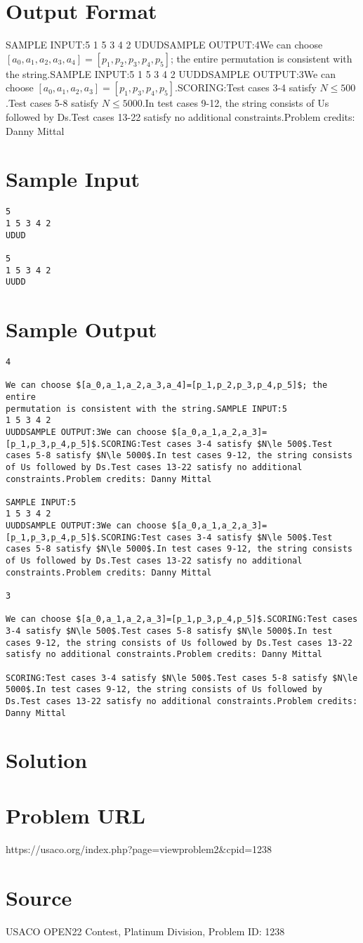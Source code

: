 \documentclass[12pt]{article}
\begin{document}
\section*{Output Format}
SAMPLE INPUT:5
1 5 3 4 2
UDUDSAMPLE OUTPUT:4We can choose $[a_0,a_1,a_2,a_3,a_4]=[p_1,p_2,p_3,p_4,p_5]$; the entire
permutation is consistent with the string.SAMPLE INPUT:5
1 5 3 4 2
UUDDSAMPLE OUTPUT:3We can choose $[a_0,a_1,a_2,a_3]=[p_1,p_3,p_4,p_5]$.SCORING:Test cases 3-4 satisfy $N\le 500$.Test cases 5-8 satisfy $N\le 5000$.In test cases 9-12, the string consists of Us followed by Ds.Test cases 13-22 satisfy no additional constraints.Problem credits: Danny Mittal

\section*{Sample Input}
\begin{verbatim}
5
1 5 3 4 2
UDUD

5
1 5 3 4 2
UUDD
\end{verbatim}

\section*{Sample Output}
\begin{verbatim}
4

We can choose $[a_0,a_1,a_2,a_3,a_4]=[p_1,p_2,p_3,p_4,p_5]$; the entire
permutation is consistent with the string.SAMPLE INPUT:5
1 5 3 4 2
UUDDSAMPLE OUTPUT:3We can choose $[a_0,a_1,a_2,a_3]=[p_1,p_3,p_4,p_5]$.SCORING:Test cases 3-4 satisfy $N\le 500$.Test cases 5-8 satisfy $N\le 5000$.In test cases 9-12, the string consists of Us followed by Ds.Test cases 13-22 satisfy no additional constraints.Problem credits: Danny Mittal

SAMPLE INPUT:5
1 5 3 4 2
UUDDSAMPLE OUTPUT:3We can choose $[a_0,a_1,a_2,a_3]=[p_1,p_3,p_4,p_5]$.SCORING:Test cases 3-4 satisfy $N\le 500$.Test cases 5-8 satisfy $N\le 5000$.In test cases 9-12, the string consists of Us followed by Ds.Test cases 13-22 satisfy no additional constraints.Problem credits: Danny Mittal

3

We can choose $[a_0,a_1,a_2,a_3]=[p_1,p_3,p_4,p_5]$.SCORING:Test cases 3-4 satisfy $N\le 500$.Test cases 5-8 satisfy $N\le 5000$.In test cases 9-12, the string consists of Us followed by Ds.Test cases 13-22 satisfy no additional constraints.Problem credits: Danny Mittal

SCORING:Test cases 3-4 satisfy $N\le 500$.Test cases 5-8 satisfy $N\le 5000$.In test cases 9-12, the string consists of Us followed by Ds.Test cases 13-22 satisfy no additional constraints.Problem credits: Danny Mittal
\end{verbatim}

\section*{Solution}


\section*{Problem URL}
https://usaco.org/index.php?page=viewproblem2&cpid=1238

\section*{Source}
USACO OPEN22 Contest, Platinum Division, Problem ID: 1238
\end{document}
